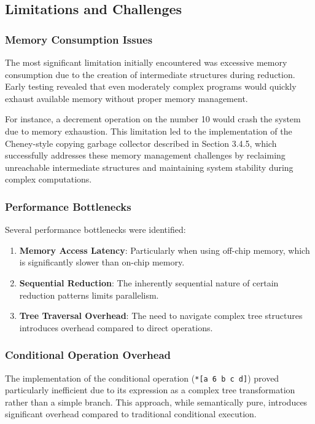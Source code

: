 \documentclass[twoside]{article}
\begin{document}
\subsection{Limitations and Challenges}

\subsubsection{Memory Consumption Issues}

The most significant limitation initially encountered was excessive memory consumption due to the creation of intermediate structures during reduction. Early testing revealed that even moderately complex programs would quickly exhaust available memory without proper memory management.

For instance, a decrement operation on the number 10 would crash the system due to memory exhaustion. This limitation led to the implementation of the Cheney-style copying garbage collector described in Section 3.4.5, which successfully addresses these memory management challenges by reclaiming unreachable intermediate structures and maintaining system stability during complex computations.

\subsubsection{Performance Bottlenecks}

Several performance bottlenecks were identified:

\begin{enumerate}
  \item \textbf{Memory Access Latency}: Particularly when using off-chip memory, which is significantly slower than on-chip memory.
  \item \textbf{Sequential Reduction}: The inherently sequential nature of certain reduction patterns limits parallelism.
  \item \textbf{Tree Traversal Overhead}: The need to navigate complex tree structures introduces overhead compared to direct operations.
\end{enumerate}

\subsubsection{Conditional Operation Overhead}

The implementation of the conditional operation (\texttt{*[a 6 b c d]}) proved particularly inefficient due to its expression as a complex tree transformation rather than a simple branch. This approach, while semantically pure, introduces significant overhead compared to traditional conditional execution.
\end{document}
